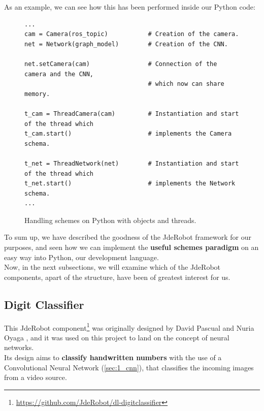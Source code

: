 \begin{itemize}
		As an example, we can see how this has been performed inside our Python code:
		
		\begin{figure}[h]
			\centering
			\begin{lstlisting}
...
cam = Camera(ros_topic)           # Creation of the camera.
net = Network(graph_model)        # Creation of the CNN.

net.setCamera(cam)                # Connection of the camera and the CNN,
                                  # which now can share memory.

t_cam = ThreadCamera(cam)         # Instantiation and start of the thread which
t_cam.start()                     # implements the Camera schema.

t_net = ThreadNetwork(net)        # Instantiation and start of the thread which
t_net.start()                     # implements the Network schema.
...
			\end{lstlisting}
			\caption{Handling schemes on Python with objects and threads.}
			\label{fig:3_schemes_python}
		\end{figure}
	\end{itemize}
	
	\vspace{0.4in}
	
	To sum up, we have described the goodness of the JdeRobot framework for our purposes, and seen how we can implement the \textbf{useful schemes paradigm} on an easy way into Python, our development language.\\
	
	Now, in the next subsections, we will examine which of the JdeRobot components, apart of the structure, have been of greatest interest for us.
	
	\subsection{Digit Classifier}
		This JdeRobot component\footnote{\url{https://github.com/JdeRobot/dl-digitclassifier}} was originally designed by David Pascual \cite{dpascualhe} and Nuria Oyaga \cite{noyaga}, and it was used on this project to land on the concept of neural networks.\\
		
		Its design aims to \textbf{classify handwritten numbers} with the use of a Convolutional Neural Network (\autoref{sec:1_cnn}), that classifies the incoming images from a video source.\\
		
